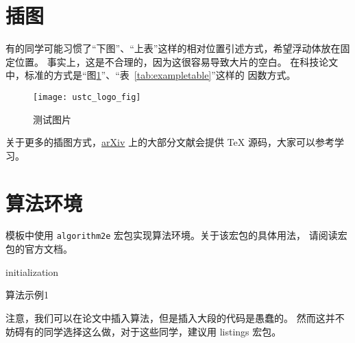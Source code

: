 \section{插图}

有的同学可能习惯了“下图”、“上表”这样的相对位置引述方式，希望浮动体放在固定位置。
事实上，这是不合理的，因为这很容易导致大片的空白。
在科技论文中，标准的方式是“图\ref{fig:logo}”、“表~\ref{tab:exampletable}”这样的
因数方式。
\begin{figure}[htbp]
\centering
\texttt{[image: ustc\_logo\_fig]}
\caption{测试图片}
\label{fig:logo}
\end{figure}

关于更多的插图方式，\href{https://arxiv.org}{arXiv} 上的大部分文献会提供 \TeX{}
源码，大家可以参考学习。



\section{算法环境}

模板中使用 \texttt{algorithm2e} 宏包实现算法环境。关于该宏包的具体用法，
请阅读宏包的官方文档。

\begin{algorithm}[htbp]
\small
\SetAlgoLined
{}

initialization\;
\caption{算法示例1}
\label{algo:algorithm1}
\end{algorithm}

注意，我们可以在论文中插入算法，但是插入大段的代码是愚蠢的。
然而这并不妨碍有的同学选择这么做，对于这些同学，建议用 \textsf{listings} 宏包。
